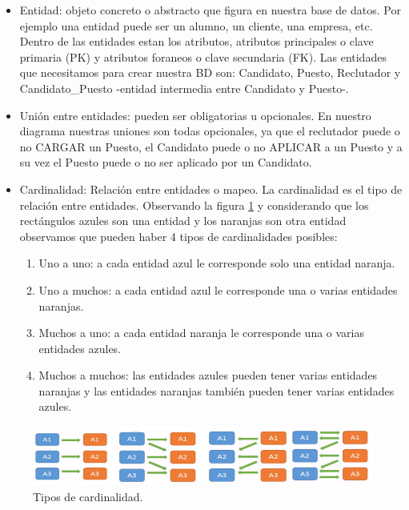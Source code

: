 \documentclass[12pt,a4paper]{article}
\begin{document}
\begin{itemize}
\item Entidad: objeto concreto o abstracto que figura en nuestra base de datos. Por ejemplo una entidad puede ser un alumno, un cliente, una empresa, etc. Dentro de las entidades estan los atributos, atributos principales o clave primaria (PK) y atributos foraneos o clave secundaria (FK).  Las entidades que necesitamos para crear nuestra BD son: Candidato, Puesto, Reclutador y Candidato\_Puesto -entidad intermedia entre Candidato y Puesto-.
\item Unión entre entidades: pueden ser obligatorias u opcionales. En nuestro diagrama nuestras uniones son todas opcionales, ya que el reclutador puede o no CARGAR un Puesto, el Candidato puede o no APLICAR a un Puesto y a su vez el Puesto puede o no ser aplicado por un Candidato. 
\item Cardinalidad: Relación entre entidades o mapeo. La cardinalidad es el tipo de relación entre entidades. Observando la figura \ref{fig:Cardinalidad} y considerando que los rectángulos azules son una entidad y los naranjas son otra entidad observamos que pueden haber 4 tipos de cardinalidades posibles:

\begin{enumerate}
\item Uno a uno: a cada entidad azul le corresponde solo una entidad naranja.
\item Uno a muchos: a cada entidad azul le corresponde una o varias entidades naranjas.
\item Muchos a uno: a cada entidad naranja le corresponde una o varias entidades azules.
\item Muchos a muchos: las entidades azules pueden tener varias entidades naranjas y las entidades naranjas también pueden tener varias entidades azules.
\end{enumerate}
\end{itemize}

\begin{figure}[H]    %
  \centering
  \includegraphics[width=1\textwidth]{images/Cardinalidad.png}
  \caption{Tipos de cardinalidad.}  
  \label{fig:Cardinalidad}
\end{figure}
\end{document}
